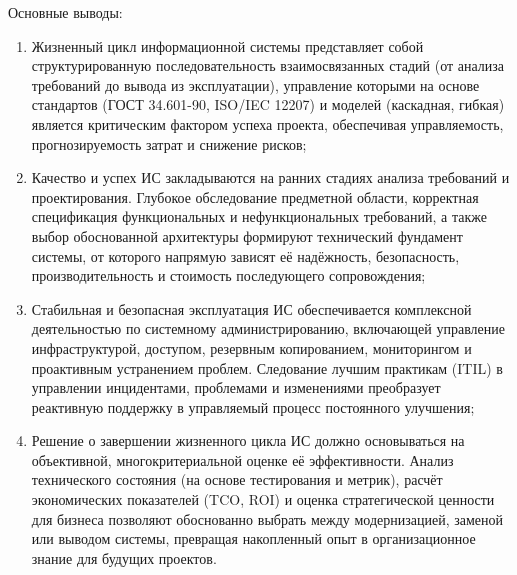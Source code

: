 \documentclass{SibFU-docs}
\begin{document}
Основные выводы:
\begin{enumerate}
    \item Жизненный цикл информационной системы представляет собой структурированную последовательность взаимосвязанных стадий (от анализа требований до вывода из эксплуатации), управление которыми на основе стандартов (ГОСТ 34.601-90, ISO/IEC 12207) и моделей (каскадная, гибкая) является критическим фактором успеха проекта, обеспечивая управляемость, прогнозируемость затрат и снижение рисков;
    \item Качество и успех ИС закладываются на ранних стадиях анализа требований и проектирования. Глубокое обследование предметной области, корректная спецификация функциональных и нефункциональных требований, а также выбор обоснованной архитектуры формируют технический фундамент системы, от которого напрямую зависят её надёжность, безопасность, производительность и стоимость последующего сопровождения;
    \item Стабильная и безопасная эксплуатация ИС обеспечивается комплексной деятельностью по системному администрированию, включающей управление инфраструктурой, доступом, резервным копированием, мониторингом и проактивным устранением проблем. Следование лучшим практикам (ITIL) в управлении инцидентами, проблемами и изменениями преобразует реактивную поддержку в управляемый процесс постоянного улучшения;
    \item Решение о завершении жизненного цикла ИС должно основываться на объективной, многокритериальной оценке её эффективности. Анализ технического состояния (на основе тестирования и метрик), расчёт экономических показателей (TCO, ROI) и оценка стратегической ценности для бизнеса позволяют обоснованно выбрать между модернизацией, заменой или выводом системы, превращая накопленный опыт в организационное знание для будущих проектов.
\end{enumerate}

\vspace{1em}
\end{document}
